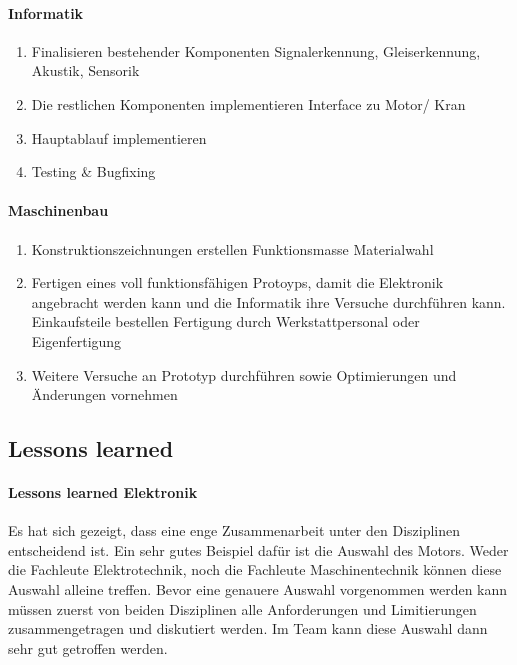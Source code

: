 \documentclass[../../main.tex]{subfiles}
\begin{document}
\paragraph{Informatik}
\begin{enumerate}
    \item Finalisieren bestehender Komponenten
        \subitem Signalerkennung, Gleiserkennung, Akustik, Sensorik
    \item Die restlichen Komponenten implementieren
        \subitem Interface zu Motor/ Kran
    \item Hauptablauf implementieren
    \item Testing \& Bugfixing
\end{enumerate}

\paragraph{Maschinenbau}
\begin{enumerate}
    \item Konstruktionszeichnungen erstellen
    \subitem Funktionsmasse
    \subitem Materialwahl
    \item Fertigen eines voll funktionsfähigen Protoyps, damit die Elektronik angebracht werden kann und die Informatik ihre Versuche durchführen kann.
    \subitem Einkaufsteile bestellen
    \subitem Fertigung durch Werkstattpersonal oder Eigenfertigung
    \item Weitere Versuche an Prototyp durchführen sowie Optimierungen und Änderungen vornehmen
\end{enumerate}

\subsection{Lessons learned}

\paragraph{Lessons learned Elektronik}
Es hat sich gezeigt, dass eine enge Zusammenarbeit unter den Disziplinen entscheidend ist. Ein sehr gutes Beispiel dafür ist die Auswahl des Motors. Weder die Fachleute Elektrotechnik, noch die Fachleute Maschinentechnik können diese Auswahl alleine treffen. Bevor eine genauere Auswahl vorgenommen werden kann müssen zuerst von beiden Disziplinen alle Anforderungen und Limitierungen zusammengetragen und diskutiert werden. Im Team kann diese Auswahl dann sehr gut getroffen werden.
\end{document}
